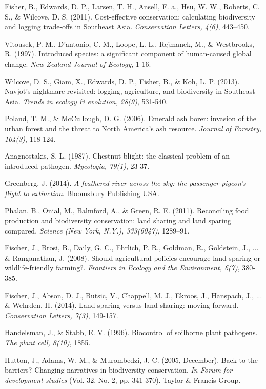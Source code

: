 \documentclass[rutwik_proposal.tex]{subfiles}
\begin{document}
\begin{thebibliography}{100}
Fisher, B., Edwards, D. P., Larsen, T. H., Ansell, F. a., Hsu, W. W., Roberts, C. S., \& Wilcove, D. S. 
(2011). 
Cost-effective conservation: calculating biodiversity and logging trade-offs in Southeast Asia. 
\emph{Conservation Letters, 4(6)}, 
443–450.

Vitousek, P. M., D'antonio, C. M., Loope, L. L., Rejmanek, M., \& Westbrooks, R.
(1997). 
Introduced species: a significant component of human-caused global change. 
\emph{New Zealand Journal of Ecology}, 
1-16.

Wilcove, D. S., Giam, X., Edwards, D. P., Fisher, B., \& Koh, L. P. 
(2013). 
Navjot's nightmare revisited: logging, agriculture, and biodiversity in Southeast Asia. 
\emph{Trends in ecology \& evolution, 28(9)}, 
531-540.

Poland, T. M., \& McCullough, D. G. 
(2006). 
Emerald ash borer: invasion of the urban forest and the threat to North America’s ash resource. 
\emph{Journal of Forestry, 104(3)}, 
118-124.

Anagnostakis, S. L. 
(1987). 
Chestnut blight: the classical problem of an introduced pathogen. 
\emph{Mycologia, 79(1)}, 
23-37.

Greenberg, J. 
(2014). 
\emph{A feathered river across the sky: the passenger pigeon's flight to extinction}. 
Bloomsbury Publishing USA.

Phalan, B., Onial, M., Balmford, A., \& Green, R. E. 
(2011). 
Reconciling food production and biodiversity conservation: land sharing and land sparing compared. 
\emph{Science (New York, N.Y.), 333(6047)}, 
1289–91.

Fischer, J., Brosi, B., Daily, G. C., Ehrlich, P. R., Goldman, R., Goldstein, J., ... \& Ranganathan, J.
(2008). 
Should agricultural policies encourage land sparing or wildlife-friendly farming?. 
\emph{Frontiers in Ecology and the Environment, 6(7)}, 
380-385.

Fischer, J., Abson, D. J., Butsic, V., Chappell, M. J., Ekroos, J., Hanspach, J., ... \& Wehrden, H. 
(2014). 
Land sparing versus land sharing: moving forward. 
\emph{Conservation Letters, 7(3)}, 
149-157.

Handelsman, J., \& Stabb, E. V. 
(1996). 
Biocontrol of soilborne plant pathogens. 
\emph{The plant cell, 8(10)}, 
1855.

Hutton, J., Adams, W. M., \& Murombedzi, J. C. 
(2005, December). 
Back to the barriers? Changing narratives in biodiversity conservation. 
\emph{In Forum for development studies}
(Vol. 32, No. 2, pp. 341-370). 
Taylor \& Francis Group.


\end{thebibliography}
\end{document}
